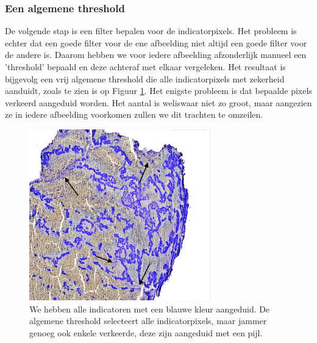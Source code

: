 \documentclass[a4paper,kulak]{kulakarticle}
\begin{document}
\subsubsection{Een algemene threshold}
De volgende stap is een filter bepalen voor de indicatorpixels. Het probleem is echter dat een goede filter voor de ene afbeelding niet altijd een goede filter voor de andere is. Daarom hebben we voor iedere afbeelding afzonderlijk manueel een 'threshold' bepaald en deze achteraf met elkaar vergeleken. Het resultaat is bijgevolg een vrij algemene threshold die alle indicatorpixels met zekerheid aanduidt, zoals te zien is op Figuur \ref{figuur alg_tresh}. Het enigste probleem is dat bepaalde pixels verkeerd aangeduid worden. Het aantal is weliswaar niet zo groot, maar aangezien ze in iedere afbeelding voorkomen zullen we dit trachten te omzeilen.
\begin{figure}[H]
	\centering
	\includegraphics[width = 0.7\textwidth]{algemene_threshold}
	
	\caption{We hebben alle indicatoren met een blauwe kleur aangeduid. De algemene threshold selecteert alle indicatorpixels, maar jammer genoeg ook enkele verkeerde, deze zijn aangeduid met een pijl.}
	\label{figuur alg_tresh}
\end{figure}
\end{document}
